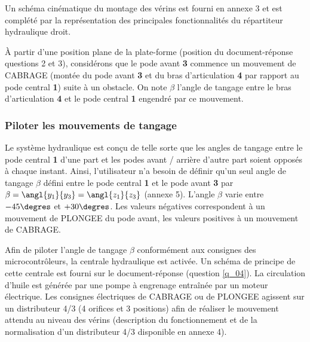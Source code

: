 Un schéma cinématique du montage des vérins est fourni en annexe 3 et est complété par la représentation des
principales fonctionnalités du répartiteur hydraulique droit.



À partir d’une position plane de la plate-forme (position du document-réponse questions 2 et 3), considérons que le
pode avant \textbf{3} commence un mouvement de CABRAGE (montée du pode avant \textbf{3} et du bras d’articulation \textbf{4} par rapport
au pode central \textbf{1}) suite à un obstacle. On note $\beta$ l’angle de tangage entre le bras d’articulation \textbf{4} et le pode central \textbf{1}
engendré par ce mouvement.


\subsubsection{Piloter les mouvements de tangage}
Le système hydraulique est conçu de telle sorte que les angles de tangage entre le pode central \textbf{1} d’une part et les
podes avant / arrière d’autre part soient opposés à chaque instant. Ainsi, l’utilisateur n’a besoin de définir qu’un seul
angle de tangage $\beta$ défini entre le pode central \textbf{1} et le pode avant \textbf{3} par $\beta=\angl{y_1}{y_3}=\angl{z_1}{z_3}$ (annexe 5). L’angle
$\beta$
varie entre $- 45\degres$ et $+30\degres$. Les valeurs négatives correspondent à un mouvement de PLONGEE du pode avant, les
valeurs positives à un mouvement de CABRAGE.

Afin de piloter l’angle de tangage $\beta$ conformément aux consignes des microcontrôleurs, la centrale hydraulique est
activée. Un schéma de principe de cette centrale est fourni sur le document-réponse (question \ref{q_04}). La circulation
d’huile est générée par une pompe à engrenage entraînée par un moteur électrique. Les consignes électriques de
CABRAGE ou de PLONGEE agissent sur un distributeur 4/3 (4 orifices et 3 positions) afin de réaliser le mouvement
attendu au niveau des vérins (description du fonctionnement et de la normalisation d’un distributeur 4/3 disponible en
annexe 4).

